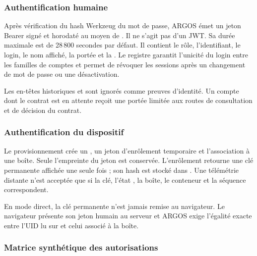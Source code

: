\subsubsection{Authentification humaine}

Après vérification du hash Werkzeug du mot de passe, ARGOS émet un jeton
Bearer signé et horodaté au moyen de
. Il ne s'agit pas d'un JWT. Sa
durée maximale est de 28\,800 secondes par défaut. Il contient le rôle,
l'identifiant, le login, le nom affiché, la portée et la
. Le registre  garantit
l'unicité du login entre les familles de comptes et permet de révoquer les
sessions après un changement de mot de passe ou une désactivation.

Les en-têtes historiques  et  sont ignorés comme
preuves d'identité. Un compte dont le contrat est en attente reçoit une portée
limitée aux routes de consultation et de décision du contrat.

\subsubsection{Authentification du dispositif}

Le provisionnement crée un , un jeton d'enrôlement temporaire
et l'association à une boîte. Seule l'empreinte du jeton est conservée.
L'enrôlement retourne une clé permanente affichée une seule fois ; son hash
est stocké dans . Une télémétrie distante n'est acceptée
que si la clé, l'état , la boîte, le conteneur et la séquence
correspondent.

En mode direct, la clé permanente n'est jamais remise au navigateur. Le
navigateur présente son jeton humain au serveur et ARGOS exige l'égalité
exacte entre l'UID lu sur  et celui associé à la boîte.

\subsubsection{Matrice synthétique des autorisations}


